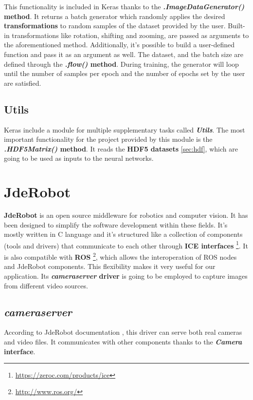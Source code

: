 This functionality is included in Keras thanks to the \textbf{\textit{.ImageDataGenerator()} method}. It returns a batch generator which randomly applies the desired \textbf{transformations} to random samples of the dataset provided by the user. Built-in transformations like rotation, shifting and zooming, are passed as arguments to the aforementioned method. Additionally, it's possible to build a user-defined function and pass it as an argument as well. The dataset, and the batch size are defined through the \textbf{\textit{.flow()} method}. During training, the generator will loop until the number of samples per epoch and the number of epochs set by the user are satisfied.

\subsection{Utils}
Keras include a module for multiple supplementary tasks called \textbf{\textit{Utils}}. The most important functionality for the project provided by this module is the \textbf{\textit{.HDF5Matrix()} method}. It reads the \textbf{HDF5 datasets} \ref{sec:hdf}, which are going to be used as inputs to the neural networks.

\section{JdeRobot}\label{sec:jderobot}
\textbf{JdeRobot} \cite{jderobot} is an open source middleware for robotics and computer vision. It has been designed to simplify the software development within these fields. It's mostly written in C\nolinebreak[4]\hspace{-.05em}\raisebox{.4ex}{\tiny\bf ++} language and it's structured like a collection of components (tools and drivers) that communicate to each other through \textbf{ICE interfaces} \footnote{\url{https://zeroc.com/products/ice}}. It is also compatible with \textbf{ROS} \footnote{\url{http://www.ros.org/}}, which allows the interoperation of ROS nodes and JdeRobot components. This flexibility makes it very useful for our application.
Its \textbf{\textit{cameraserver} driver} is going to be employed to capture images from different video sources.

\subsection{\textit{cameraserver}}\label{subsec:cameraserver}
According to JdeRobot documentation \cite{jderobot}, this driver can serve both real cameras and video files. It communicates with other components thanks to the \textbf{\textit{Camera} interface}.

